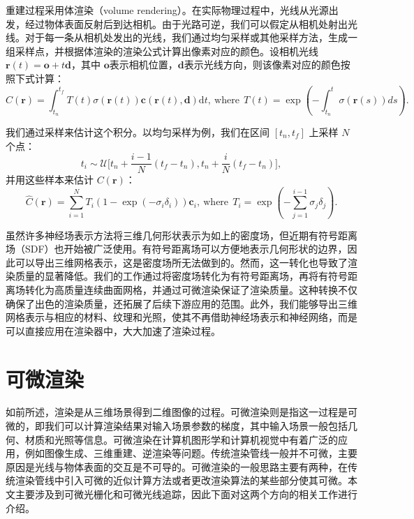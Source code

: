 重建过程采用体渲染（volume rendering）。在实际物理过程中，光线从光源出发，经过物体表面反射后到达相机。由于光路可逆，我们可以假定从相机处射出光线。对于每一条从相机处发出的光线，我们通过均匀采样或其他采样方法，生成一组采样点，并根据体渲染的渲染公式计算出像素对应的颜色。设相机光线 $\mathbf{r}(t)=\mathbf{o}+t\mathbf{d}$，其中 $\mathbf{o}$表示相机位置，$\mathbf{d}$表示光线方向，则该像素对应的颜色按照下式计算：
\begin{equation}
  C(\mathbf{r})=\int_{t_n}^{t_f}T(t)\sigma(\mathbf{r}(t))\mathbf{c}(\mathbf{r}(t),\mathbf{d}) \mathrm{d}t , \ \mathrm{where} \ \ T(t)=\exp\left(-\int_{t_n}^t\sigma(\mathbf{r}(s))ds\right).
\end{equation}

我们通过采样来估计这个积分。以均匀采样为例，我们在区间 $\left[t_n,t_f\right]$ 上采样 $N$ 个点：
\begin{equation}
  t_i\sim\mathcal{U}\bigg[t_n+\frac{i-1}{N}(t_f-t_n), t_n+\frac{i}{N}(t_f-t_n)\bigg],
\end{equation}
并用这些样本来估计 $C(\mathbf{r})$：
\begin{equation}
  \hat C(\mathbf{r})=\sum_{i=1}^NT_i(1-\exp(-\sigma_i\delta_i))\mathbf{c}_i , \ \mathrm{where} \ \ T_i=\exp\left(-\sum_{j=1}^{i-1}\sigma_j\delta_j\right).
\end{equation}

虽然许多神经场表示方法将三维几何形状表示为如上的密度场，但近期有符号距离场（SDF）也开始被广泛使用。有符号距离场可以方便地表示几何形状的边界，因此可以导出三维网格表示，这是密度场所无法做到的。然而，这一转化也导致了渲染质量的显著降低。我们的工作通过将密度场转化为有符号距离场，再将有符号距离场转化为高质量连续曲面网格，并通过可微渲染保证了渲染质量。这种转换不仅确保了出色的渲染质量，还拓展了后续下游应用的范围。此外，我们能够导出三维网格表示与相应的材料、纹理和光照，使其不再借助神经场表示和神经网络，而是可以直接应用在渲染器中，大大加速了渲染过程。

\section{可微渲染}

如前所述，渲染是从三维场景得到二维图像的过程。可微渲染则是指这一过程是可微的，即我们可以计算渲染结果对输入场景参数的梯度，其中输入场景一般包括几何、材质和光照等信息。可微渲染在计算机图形学和计算机视觉中有着广泛的应用，例如图像生成、三维重建、逆渲染等问题。传统渲染管线一般并不可微，主要原因是光线与物体表面的交互是不可导的。可微渲染的一般思路主要有两种，在传统渲染管线中引入可微的近似计算方法或者更改渲染算法的某些部分使其可微。本文主要涉及到可微光栅化和可微光线追踪，因此下面对这两个方向的相关工作进行介绍。

